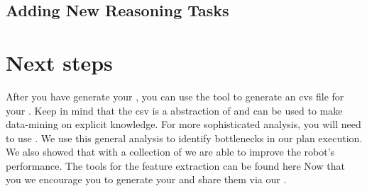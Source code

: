 \subsection{Adding New Reasoning Tasks}



\section{Next steps}
After you have generate your \neem, you can use the tool  to generate an cvs file for your \neem.
Keep in mind that the csv is a abstraction of \neemnar and can be used to make data-mining on explicit knowledge.
For more sophisticated analysis, you will need to use \knowrob. 
We use this general analysis to identify bottlenecks in our plan execution.
We also showed that with a collection of \neems we are able to improve the robot's performance.
The tools for the feature extraction can be found here 
Now that you we encourage you to generate your \neems and share them via our \neemhub.


